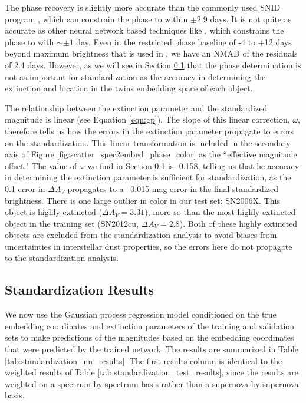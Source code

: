 The phase recovery is slightly more accurate than the commonly used SNID program \citep{blondin_determining_2007}, which can constrain the phase to within $\pm 2.9$ days. It is not quite as accurate as other neural network based techniques like \citet{stahl_deepsip_2020}, which constrains the phase to with $\sim\pm 1$ day. Even in the restricted phase baseline of -4 to +12 days beyond maximum brightness that is used in \citet{stahl_deepsip_2020}, we have an NMAD of the residuals of 2.4 days. However, as we will see in Section \ref{sec:standardization} that the phase determination is not as important for standardization as the accuracy in determining the extinction and location in the twins embedding space of each object. 

The relationship between the extinction parameter and the standardized magnitude is linear (see Equation \ref{eqn:gp}). The slope of this linear correction, $\omega$, therefore tells us how the errors in the extinction parameter propagate to errors on the standardization. This linear transformation is included in the secondary axis of Figure \ref{fig:scatter_spec2embed_phase_color} as the ``effective magnitude offset." The value of $\omega$ we find in Section \ref{sec:standardization} is -0.158, telling us that he accuracy in determining the extinction parameter is sufficient for standardization, as the 0.1 error in $\Delta A_V$ propagates to a ~0.015 mag error in the final standardized brightness. There is one large outlier in color in our test set: SN2006X. This object is highly extincted ($\Delta A_V=3.31$), more so than the most highly extincted object in the training set (SN2012cu, $\Delta A_V=2.8$). Both of these highly extincted objects are excluded from the standardization analysis to avoid biases from uncertainties in interstellar dust properties, so the errors here do not propagate to the standardization analysis.

\subsection{Standardization Results} 
\label{sec:standardization}
We now use the Gaussian process regression model conditioned on the true embedding coordinates and extinction parameters of the training and validation sets to make predictions of the magnitudes based on the embedding coordinates that were predicted by the trained \stoe{} network. The results are summarized in Table \ref{tab:standardization_nn_results}. The first results column is identical to the weighted results of Table \ref{tab:standardization_test_results}, since the results are weighted on a spectrum-by-spectrum basis rather than a supernova-by-supernova basis.

